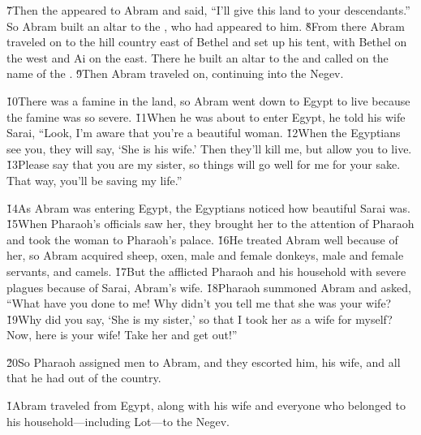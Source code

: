 \v{7}Then the  appeared to Abram and said, ``I'll give this land to your descendants.'' So Abram built an altar to the , who had appeared to him. \v{8}From there Abram traveled on to the hill country east of Bethel and set up his tent, with Bethel on the west and Ai on the east. There he built an altar to the  and called on the name of the . \v{9}Then Abram traveled on, continuing into the Negev.

\v{10}There was a famine in the land, so Abram went down to Egypt to live because the famine was so severe. \v{11}When he was about to enter Egypt, he told his wife Sarai, ``Look, I'm aware that you're a beautiful woman. \v{12}When the Egyptians see you, they will say, `She is his wife.' Then they'll kill me, but allow you to live. \v{13}Please say that you are my sister, so things will go well for me for your sake. That way, you'll be saving my life.''

\v{14}As Abram was entering Egypt, the Egyptians noticed how beautiful Sarai was. \v{15}When Pharaoh's officials saw her, they brought her to the attention of Pharaoh and took the woman to Pharaoh's palace. \v{16}He treated Abram well because of her, so Abram acquired sheep, oxen, male and female donkeys, male and female servants, and camels. \v{17}But the  afflicted Pharaoh and his household with severe plagues because of Sarai, Abram's wife. \v{18}Pharaoh summoned Abram and asked, ``What have you done to me! Why didn't you tell me that she was your wife? \v{19}Why did you say, `She is my sister,' so that I took her as a wife for myself? Now, here is your wife! Take her and get out!''

\v{20}So Pharaoh assigned men to Abram, and they escorted him, his wife, and all that he had out of the country.

\v{1}Abram traveled from Egypt, along with his wife and everyone who belonged to his household---including Lot---to the Negev.

